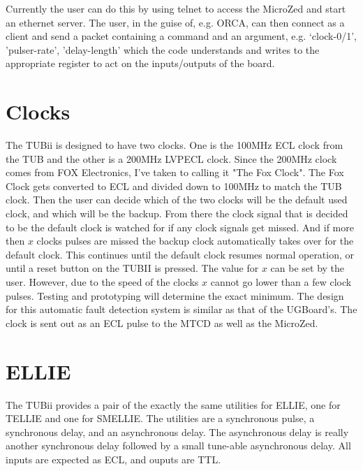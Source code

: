 \documentclass[11pt,a4paper]{article}
\begin{document}
Currently the user can do this by using telnet to access the MicroZed and start an ethernet server. The user, in the guise of, e.g. ORCA, can then connect as a client and send a packet containing a command and an argument, e.g. `clock-0/1', 'pulser-rate', 'delay-length' which the code understands and writes to the appropriate register to act on the inputs/outputs of the board.

\section{Clocks}
The TUBii is designed to have two clocks. One is the 100MHz ECL clock from the TUB and the other is a 200MHz LVPECL clock. Since the 200MHz clock comes from FOX Electronics, I've taken to calling it "The Fox Clock". The Fox Clock gets converted to ECL and divided down to 100MHz to match the TUB clock. Then the user can decide which of the two clocks will be the default used clock, and which will be the backup. From there the clock signal that is decided to be the default clock is watched for if any clock signals get missed. And if more then $x$ clocks pulses are missed the backup clock automatically takes over for the default clock. This continues until the default clock resumes normal operation, or until a reset button on the TUBII is pressed. The value for $x$ can be set by the user. However, due to the speed of the clocks $x$ cannot go lower than a few clock pulses. Testing and prototyping will determine the exact minimum. The design for this automatic fault detection system is similar as that of the UGBoard's. The clock is sent out as an ECL pulse to the MTCD as well as the MicroZed.
\section{ELLIE}
The TUBii provides a pair of the exactly the same utilities for ELLIE, one for TELLIE and one for SMELLIE.
The utilities are a synchronous pulse, a synchronous delay, and an asynchronous delay.    The asynchronous delay is really another synchronous delay followed by a small tune-able asynchronous delay. All inputs are expected as ECL, and ouputs are TTL.
\end{document}

